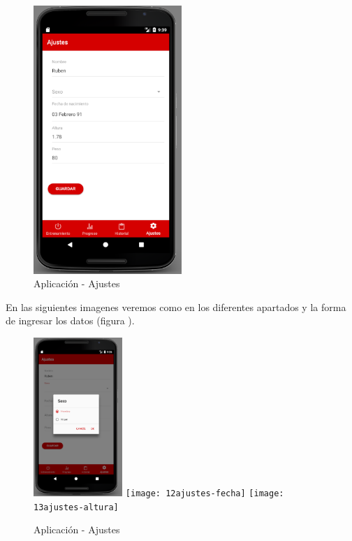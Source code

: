 \documentclass[a4paper, 11pt]{article}
\begin{document}
\begin{itemize}
                \begin{figure}[H]
                 \centering
                 \includegraphics[width=0.5\textwidth]{10ajustes-completo}
                 \caption{Aplicación - Ajustes}
                 \label{f:app-ajustes-completo}
                \end{figure}

  En las siguientes imagenes veremos como en los diferentes apartados y la forma de ingresar los datos (figura
  \label{f:app-ajustes-completo}).\\

                \begin{figure}[H]
                 \centering
                 \includegraphics[width=0.3\textwidth]{11ajustes-sexo}
                 \texttt{[image: 12ajustes-fecha]}
                 \texttt{[image: 13ajustes-altura]}
                 \caption{Aplicación - Ajustes}
                 \label{f:app-ajustes-completo}
                \end{figure}


\end{itemize}
\end{document}
